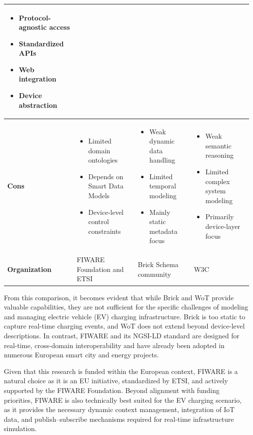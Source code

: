 \begin{table}[htb]
\begin{tabular}{|>{\raggedright\arraybackslash}p{2.8cm}|>{\raggedright\arraybackslash}p{4cm}|>{\raggedright\arraybackslash}p{4cm}|>{\raggedright\arraybackslash}p{4cm}|}
\begin{itemize}[leftmargin=*,nosep,after=\strut]
\item Protocol-agnostic access
\item Standardized APIs
\item Web integration
\item Device abstraction
\end{itemize} \\ 
\hline
\textbf{Cons} & 
\begin{itemize}[leftmargin=*,nosep,after=\strut]
\item Limited domain ontologies
\item Depends on Smart Data Models
\item Device-level control constraints
\end{itemize} & 
\begin{itemize}[leftmargin=*,nosep,after=\strut]
\item Weak dynamic data handling
\item Limited temporal modeling
\item Mainly static metadata focus
\end{itemize} & 
\begin{itemize}[leftmargin=*,nosep,after=\strut]
\item Weak semantic reasoning
\item Limited complex system modeling
\item Primarily device-layer focus
\end{itemize} \\ 
\hline
\textbf{Organization} & 
FIWARE Foundation and ETSI & 
Brick Schema community & 
W3C \\ 
\hline
\end{tabular}
\end{table}

From this comparison, it becomes evident that while Brick and WoT
provide valuable capabilities, they are not sufficient for the specific
challenges of modeling and managing electric vehicle (EV) charging
infrastructure. Brick is too static to capture real-time charging events,
and WoT does not extend beyond device-level descriptions. In
contrast, FIWARE and its NGSI-LD standard are designed for
real-time, cross-domain interoperability and have already been
adopted in numerous European smart city and energy projects.

Given that this research is funded within the European context, FIWARE is a natural choice as it is an EU
initiative, standardized by ETSI, and actively supported by the FIWARE
Foundation. Beyond alignment with funding priorities, FIWARE is also
technically best suited for the EV charging scenario, as it provides the
necessary dynamic context management, integration of IoT data, and
publish–subscribe mechanisms required for real-time infrastructure
simulation.

